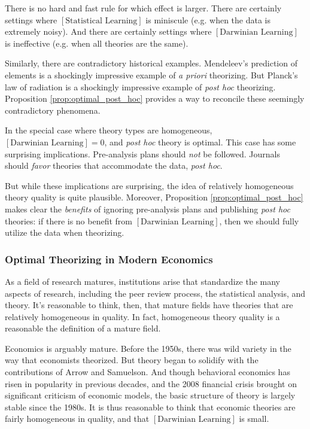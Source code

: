 \documentclass[12pt,english]{article}
\theoremstyle{plain}
\theoremstyle{plain}
\begin{document}
There is no hard and fast rule for which effect is larger. There are certainly settings where $\left[\text{Statistical Learning}\right]$ is miniscule (e.g. when the data is extremely noisy). And there are certainly settings where $\left[\text{Darwinian Learning}\right]$ is ineffective (e.g. when all theories are the same). 

Similarly, there are contradictory historical examples. Mendeleev's prediction of elements is a shockingly impressive example of \emph{a priori} theorizing. But Planck's law of radiation is a shockingly impressive example of \emph{post hoc} theorizing. Proposition \ref{prop:optimal_post_hoc} provides a way to reconcile these seemingly contradictory phenomena.


In the special case where theory types are homogeneous, $\left[\text{Darwinian Learning}\right]=0$, and \emph{post hoc} theory is optimal. This case has some surprising implications. Pre-analysis plans should \emph{not} be followed.  Journals should \emph{favor}  theories that accommodate the data, \emph{post hoc}. 

But while these implications are surprising, the idea of relatively homogeneous theory quality is quite plausible. Moreover, Proposition \ref{prop:optimal_post_hoc} makes clear the \emph{benefits} of ignoring pre-analysis plans and publishing \emph{post hoc} theories: if there is no benefit from $\left[\text{Darwinian Learning}\right]$, then we should fully utilize the data when theorizing.


\subsubsection{Optimal Theorizing in Modern Economics}

As a field of research matures, institutions arise that standardize the many aspects of research, including the peer review process, the statistical analysis, and  theory. It's reasonable to think, then, that mature fields have theories that are relatively homogeneous in quality. In fact, homogeneous theory quality is a reasonable the definition of a mature field.

Economics is arguably mature. Before the 1950s, there was wild variety in the way that economists theorized. But theory began to solidify with the contributions of Arrow and Samuelson. And though behavioral economics has risen in popularity in previous decades, and the 2008 financial crisis brought on significant criticism of economic models, the basic structure of theory is largely stable since the 1980s. It is thus reasonable to think that economic theories are fairly homogeneous in quality, and that $\left[\text{Darwinian Learning}\right]$ is small. 
\end{document}
